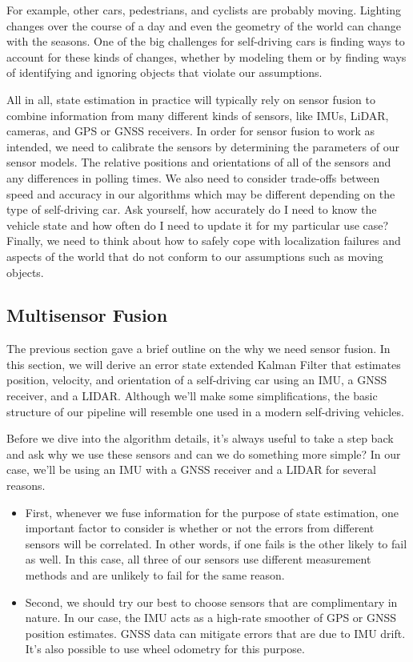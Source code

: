 For example, other cars, pedestrians, and cyclists are probably moving. Lighting changes over the course of a day and even the geometry of the world can change with the seasons. 
One of the big challenges for self-driving cars is finding ways to account for these kinds of changes, whether by modeling them or by finding ways of identifying and ignoring objects that violate our assumptions. 

All in all, state estimation in practice will typically rely on sensor fusion to combine information from many different kinds of sensors, like IMUs, LiDAR, cameras, and GPS or GNSS receivers. In order for sensor fusion to work as intended, we need to calibrate the sensors by determining the parameters of our sensor models. The relative positions and orientations of all of the sensors and any differences in polling times. We also need to consider trade-offs between speed and accuracy in our algorithms which may be different depending on the type of self-driving car. Ask yourself, how accurately do I need to know the vehicle state and how often do I need to update it for my particular use case? Finally, we need to think about how to safely cope with localization failures and aspects of the world that do not conform to our assumptions such as moving objects. 




\subsection{Multisensor Fusion}
\label{multisensor_fusion}

The previous section gave a brief outline on the why we need sensor fusion.  In this section,
we will derive an error state extended Kalman Filter that
estimates position, velocity, and orientation of a self-driving car using an IMU, a GNSS receiver,
and a LIDAR. Although we'll make some simplifications, the basic structure
of our pipeline will resemble one used in a modern self-driving vehicles. 

Before we dive into
the algorithm details, it's always useful to take a step back and ask why we use these sensors and can we do something
more simple? In our case, we'll be using an IMU with a GNSS receiver and a LIDAR for several reasons. 

\begin{itemize}
\item First, whenever we fuse information for the purpose of state estimation, one important factor
to consider is whether or not the errors from different sensors will be correlated. In other words,
if one fails is the other likely to fail as well. In this case, all three of our sensors use different measurement
methods and are unlikely to fail for the same reason. 
\item Second, we should try our best to choose sensors that are complimentary in nature. In our case, the IMU acts as a high-rate
smoother of GPS or GNSS position estimates. GNSS data can mitigate errors that are due to IMU drift. It's also possible to use wheel odometry for this purpose. 
\end{itemize}

